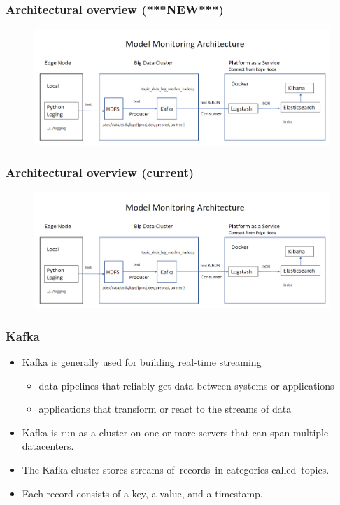\documentclass[11pt]{beamer}
\begin{document}
\begin{frame}
\frametitle{Architectural overview (***NEW***)}
\begin{figure}[h]
\includegraphics[scale=.25]{images/arch2}
\end{figure}
\end{frame}

\begin{frame}
\frametitle{Architectural overview (current)}
\begin{figure}[h]
	\includegraphics[scale=.25]{images/arch2}
\end{figure}
\end{frame}

\begin{frame}
\frametitle{Kafka}
\begin{itemize}
\item Kafka is generally used for building real-time streaming 
\begin{itemize}
\item data pipelines that reliably get data between systems or applications
\item applications that transform or react to the streams of data
\end{itemize}
\item Kafka is run as a cluster on one or more servers that can span multiple datacenters.
\item The Kafka cluster stores streams of records in categories called topics.
\item Each record consists of a key, a value, and a timestamp.
\end{itemize}
\end{frame}
\end{document}
